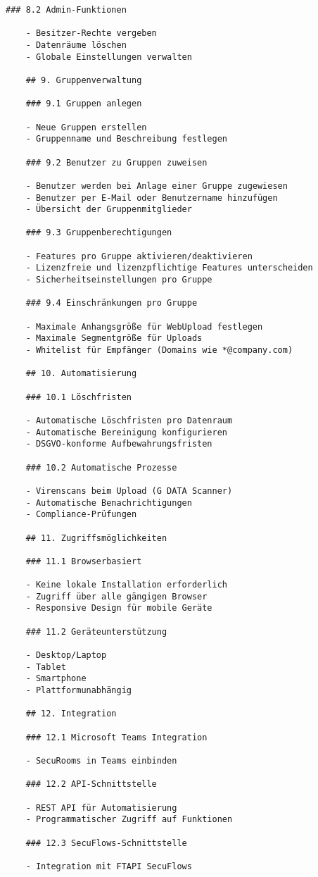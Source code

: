 \begin{Verbatim}[breaklines=true]
    ### 8.2 Admin-Funktionen
    
    - Besitzer-Rechte vergeben
    - Datenräume löschen
    - Globale Einstellungen verwalten
    
    ## 9. Gruppenverwaltung
    
    ### 9.1 Gruppen anlegen
    
    - Neue Gruppen erstellen
    - Gruppenname und Beschreibung festlegen
    
    ### 9.2 Benutzer zu Gruppen zuweisen
    
    - Benutzer werden bei Anlage einer Gruppe zugewiesen
    - Benutzer per E-Mail oder Benutzername hinzufügen
    - Übersicht der Gruppenmitglieder
    
    ### 9.3 Gruppenberechtigungen
    
    - Features pro Gruppe aktivieren/deaktivieren
    - Lizenzfreie und lizenzpflichtige Features unterscheiden
    - Sicherheitseinstellungen pro Gruppe
    
    ### 9.4 Einschränkungen pro Gruppe
    
    - Maximale Anhangsgröße für WebUpload festlegen
    - Maximale Segmentgröße für Uploads
    - Whitelist für Empfänger (Domains wie *@company.com)
    
    ## 10. Automatisierung
    
    ### 10.1 Löschfristen
    
    - Automatische Löschfristen pro Datenraum
    - Automatische Bereinigung konfigurieren
    - DSGVO-konforme Aufbewahrungsfristen
    
    ### 10.2 Automatische Prozesse
    
    - Virenscans beim Upload (G DATA Scanner)
    - Automatische Benachrichtigungen
    - Compliance-Prüfungen
    
    ## 11. Zugriffsmöglichkeiten
    
    ### 11.1 Browserbasiert
    
    - Keine lokale Installation erforderlich
    - Zugriff über alle gängigen Browser
    - Responsive Design für mobile Geräte
    
    ### 11.2 Geräteunterstützung
    
    - Desktop/Laptop
    - Tablet
    - Smartphone
    - Plattformunabhängig
    
    ## 12. Integration
    
    ### 12.1 Microsoft Teams Integration
    
    - SecuRooms in Teams einbinden
    
    ### 12.2 API-Schnittstelle
    
    - REST API für Automatisierung
    - Programmatischer Zugriff auf Funktionen
    
    ### 12.3 SecuFlows-Schnittstelle
    
    - Integration mit FTAPI SecuFlows
\end{Verbatim}

